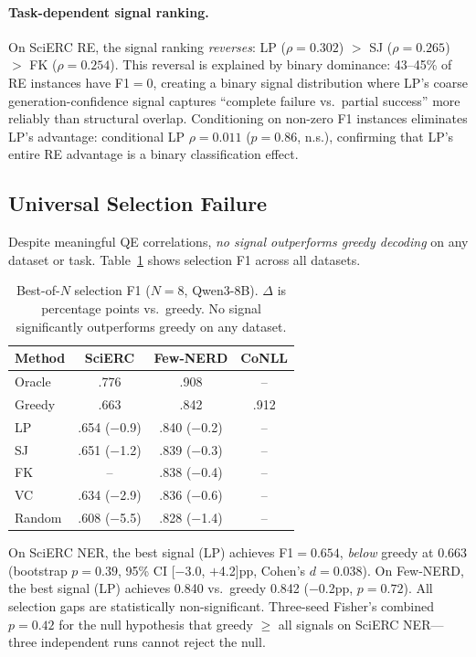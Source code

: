 \documentclass[11pt,twocolumn]{article}
\begin{document}
\paragraph{Task-dependent signal ranking.}
On SciERC RE, the signal ranking \emph{reverses}: LP ($\rho{=}0.302$) $>$ SJ ($\rho{=}0.265$) $>$ FK ($\rho{=}0.254$).
This reversal is explained by binary dominance: 43--45\% of RE instances have F1${=}0$, creating a binary signal distribution where LP's coarse generation-confidence signal captures ``complete failure vs.\ partial success'' more reliably than structural overlap.
Conditioning on non-zero F1 instances eliminates LP's advantage: conditional LP $\rho{=}0.011$ ($p{=}0.86$, n.s.), confirming that LP's entire RE advantage is a binary classification effect.

\subsection{Universal Selection Failure}
\label{sec:selection}

Despite meaningful QE correlations, \emph{no signal outperforms greedy decoding} on any dataset or task.
Table~\ref{tab:selection} shows selection F1 across all datasets.

\begin{table}[t]
\centering
\small
\caption{Best-of-$N$ selection F1 ($N{=}8$, Qwen3-8B). $\Delta$ is percentage points vs.\ greedy. No signal significantly outperforms greedy on any dataset.}
\label{tab:selection}
\begin{tabular}{@{}l ccc@{}}
\toprule
Method & SciERC & Few-NERD & CoNLL \\
\midrule
Oracle  & .776 & .908 & -- \\
Greedy  & .663 & .842 & .912 \\
LP      & .654 ($-$0.9) & .840 ($-$0.2) & -- \\
SJ      & .651 ($-$1.2) & .839 ($-$0.3) & -- \\
FK      & -- & .838 ($-$0.4) & -- \\
VC      & .634 ($-$2.9) & .836 ($-$0.6) & -- \\
Random  & .608 ($-$5.5) & .828 ($-$1.4) & -- \\
\bottomrule
\end{tabular}
\end{table}

On SciERC NER, the best signal (LP) achieves F1${=}0.654$, \emph{below} greedy at 0.663 (bootstrap $p{=}0.39$, 95\% CI [$-$3.0, $+$4.2]pp, Cohen's $d{=}0.038$).
On Few-NERD, the best signal (LP) achieves 0.840 vs.\ greedy 0.842 ($-$0.2pp, $p{=}0.72$).
All selection gaps are statistically non-significant.
Three-seed Fisher's combined $p{=}0.42$ for the null hypothesis that greedy $\geq$ all signals on SciERC NER---three independent runs cannot reject the null.
\end{document}
